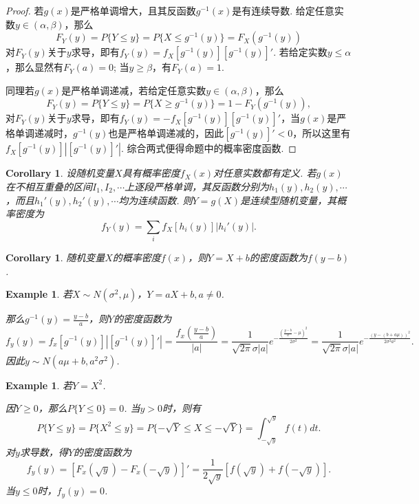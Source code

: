 \documentclass{article}
\newtheorem{corollary}[theorem]{Corollary}
\newtheorem{example}[theorem]{Example}
\begin{document}
\begin{proof}
若$g(x)$是严格单调增大，且其反函数$g^{-1}(x)$是有连续导数. 给定任意实数$y \in (\alpha,\beta)$，那么
$$
F_Y(y) = P\{Y \leq y \} = P\{X \leq g^{-1}(y)\} = F_X(g^{-1}(y))
$$
对$F_Y(y)$关于$y$求导，即有$f_Y(y) = f_X\left[ g^{-1}(y) \right]\left[g^{-1}(y)\right]'$. 若给定实数$y \leq \alpha$，那么显然有$F_Y(a) = 0$; 当$y \geq \beta$，有$F_Y(a) = 1$.

同理若$g(x)$是严格单调递减，若给定任意实数$y \in (\alpha,\beta)$，那么
$$
F_Y(y) = P\{Y \leq y \} = P\{X \geq g^{-1}(y)\} = 1-F_Y(g^{-1}(y)), 
$$
对$F_Y(y)$关于$y$求导，即有$f_Y(y) = -f_X\left[ g^{-1}(y) \right]\left[g^{-1}(y)\right]'$，当$g(x)$是严格单调递减时，$g^{-1}(y)$也是严格单调递减的，因此$\left[g^{-1}(y)\right]' < 0$，所以这里有$f_X\left[ g^{-1}(y) \right]|\left[g^{-1}(y)\right]'|$. 综合两式便得命题中的概率密度函数. 
\end{proof}

\begin{corollary}
\rm 设随机变量$X$具有概率密度$f_X(x)$对任意实数都有定义. 若$g(x)$在不相互重叠的区间$I_1,I_2,\cdots$上逐段严格单调，其反函数分别为$h_1(y),h_2(y),\cdots$，而且$h_1'(y),h_2'(y),\cdots$均为连续函数. 则$Y=g(X)$是连续型随机变量，其概率密度为
$$
f_Y(y) = \sum\limits_{i}f_X\left[h_i(y)\right]|h_i'(y)|. 
$$
\end{corollary}

\begin{corollary}
\rm 随机变量$X$的概率密度$f(x)$，则$Y=X+b$的密度函数为$f(y-b)$.
\end{corollary}

\begin{example}
\rm 若$X \sim N(\sigma^2,\mu)$，$Y=aX+b,a\neq 0$. 

那么$g^{-1}(y) = \frac{y-b}{a}$，则$Y$的密度函数为
$$
f_y(y) = f_x[g^{-1}(y)]|[g^{-1}(y)]'|= \frac{f_x(\frac{y-b}{a})}{|a|} = \frac{1}{\sqrt{2\pi}\sigma|a|}e^{-\frac{(\frac{y-b}{a}-\mu)^2}{2\sigma^2}} = \frac{1}{\sqrt{2\pi}\sigma|a|}e^{-\frac{(y-(b+a\mu))^2}{2\sigma^2a^2}}.
$$
因此$y \sim N(a\mu+b,a^2\sigma^2)$.
\end{example}

\begin{example}
\rm 若$Y=X^2$.

因$Y \geq 0$，那么$P\{Y \leq 0\} = 0$. 当$y > 0$时，则有
$$
P\{Y \leq y\} = P\{X^2 \leq y\} = P\{-\sqrt{Y} \leq X \leq -\sqrt{Y}\} = \int_{-\sqrt{y}}^{\sqrt{y}} f(t)dt.
$$
对$y$求导数，得$Y$的密度函数为
$$
f_y(y) = [F_x(\sqrt{y})-F_x(-\sqrt{y})]' = \frac{1}{2\sqrt{y}}[f(\sqrt{y}) + f(-\sqrt{y})].
$$
当$y \leq 0$时，$f_y(y)=0$. 
\end{example}
\end{document}
